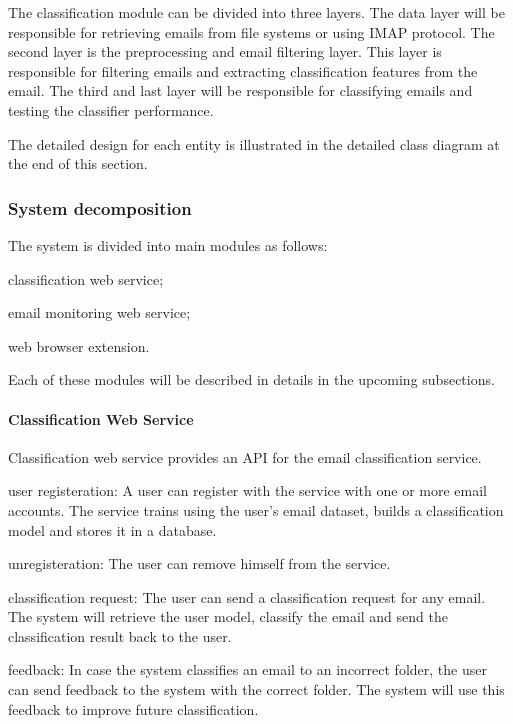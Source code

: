The classification module can be divided into three layers. The data layer will be 
responsible for retrieving emails from file systems or using IMAP protocol. The 
second layer is the preprocessing and email filtering layer. This layer is 
responsible for filtering emails and extracting classification features from the 
email. The third and last layer will be responsible for classifying emails and 
testing the classifier performance.

The detailed design for each entity is illustrated in the detailed class 
diagram at the end of this section.

\subsubsection{System decomposition}
The system is divided into main modules as follows:
\begin{my_itemize}
  \item classification web service;
  \item email monitoring web service;
  \item web browser extension.
\end{my_itemize}
Each of these modules will be described in details in the upcoming subsections.

\paragraph{Classification Web Service}

Classification web service provides an API for the email classification service.
\begin{my_itemize}
	\item user registeration: A user can register with the service with one or more email accounts. The service trains using the user's email dataset, builds a classification model and stores it in a database.
	
	\item unregisteration: The user can remove himself from the service.

	\item classification request: The user can send a classification request for any email. The system will retrieve the user model, classify the email and send the classification result back to the user.

	\item feedback: In case the system classifies an email to an incorrect folder, the user can send feedback to the system with the correct folder. The system will use this feedback to improve future classification.

\end{my_itemize}

